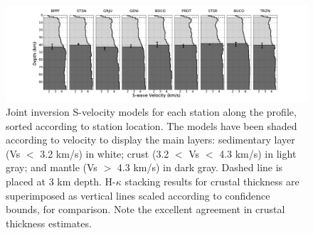 \documentclass[manuscript,11pt]{geophysics}
\begin{document}
\begin{figure}[!ht]
\begin{center}
\includegraphics[width=1.1\textwidth]{Fig/section_joint_inversion_25.pdf}
\caption{Joint inversion S-velocity models for each station along the profile, sorted according to station location. The models have been shaded according to velocity to display the main layers: sedimentary layer (Vs $<$ 3.2 km/s) in white; crust (3.2 $<$ Vs $<$ 4.3 km/s) in light gray; and mantle (Vs $>$ 4.3 km/s) in dark gray. Dashed line is placed at 3 km depth. H-$\kappa$ stacking results for crustal thickness are superimposed as vertical lines scaled according to confidence bounds, for comparison. Note the excellent agreement in crustal thickness estimates.}
\label{moisaic_joint_inversion}
\end{center}
\end{figure}
 
\end{document}
